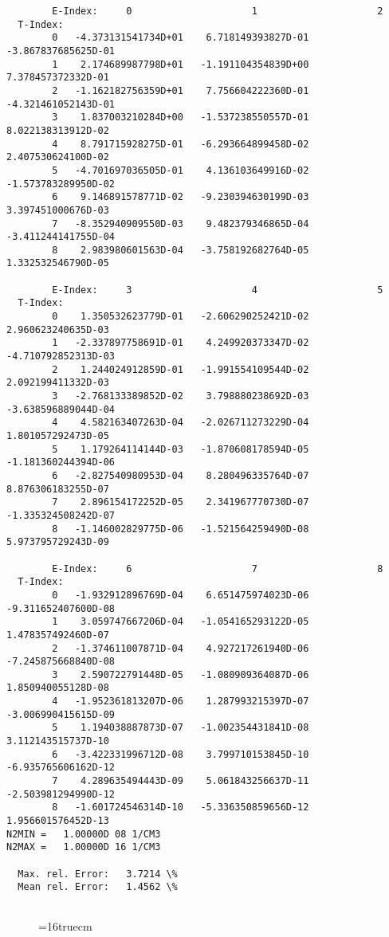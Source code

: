 \documentclass[12pt,dvipdfmx]{article}
\begin{document}
\begin{small}\begin{verbatim}
        E-Index:     0                     1                     2
  T-Index:
        0   -4.373131541734D+01    6.718149393827D-01   -3.867837685625D-01
        1    2.174689987798D+01   -1.191104354839D+00    7.378457372332D-01
        2   -1.162182756359D+01    7.756604222360D-01   -4.321461052143D-01
        3    1.837003210284D+00   -1.537238550557D-01    8.022138313912D-02
        4    8.791715928275D-01   -6.293664899458D-02    2.407530624100D-02
        5   -4.701697036505D-01    4.136103649916D-02   -1.573783289950D-02
        6    9.146891578771D-02   -9.230394630199D-03    3.397451000676D-03
        7   -8.352940909550D-03    9.482379346865D-04   -3.411244141755D-04
        8    2.983980601563D-04   -3.758192682764D-05    1.332532546790D-05

        E-Index:     3                     4                     5
  T-Index:
        0    1.350532623779D-01   -2.606290252421D-02    2.960623240635D-03
        1   -2.337897758691D-01    4.249920373347D-02   -4.710792852313D-03
        2    1.244024912859D-01   -1.991554109544D-02    2.092199411332D-03
        3   -2.768133389852D-02    3.798880238692D-03   -3.638596889044D-04
        4    4.582163407263D-04   -2.026711273229D-04    1.801057292473D-05
        5    1.179264114144D-03   -1.870608178594D-05   -1.181360244394D-06
        6   -2.827540980953D-04    8.280496335764D-07    8.876306183255D-07
        7    2.896154172252D-05    2.341967770730D-07   -1.335324508242D-07
        8   -1.146002829775D-06   -1.521564259490D-08    5.973795729243D-09

        E-Index:     6                     7                     8
  T-Index:
        0   -1.932912896769D-04    6.651475974023D-06   -9.311652407600D-08
        1    3.059747667206D-04   -1.054165293122D-05    1.478357492460D-07
        2   -1.374611007871D-04    4.927217261940D-06   -7.245875668840D-08
        3    2.590722791448D-05   -1.080909364087D-06    1.850940055128D-08
        4   -1.952361813207D-06    1.287993215397D-07   -3.006990415615D-09
        5    1.194038887873D-07   -1.002354431841D-08    3.112143515737D-10
        6   -3.422331996712D-08    3.799710153845D-10   -6.935765606162D-12
        7    4.289635494443D-09    5.061843256637D-11   -2.503981294990D-12
        8   -1.601724546314D-10   -5.336350859656D-12    1.956601576452D-13
N2MIN =   1.00000D 08 1/CM3
N2MAX =   1.00000D 16 1/CM3

  Max. rel. Error:   3.7214 \%
  Mean rel. Error:   1.4562 \%


\end{verbatim}\end{small}
\begin{figure} \label{2.2.5mai}
\epsfxsize=16truecm
\end{figure}
\newpage
\end{document}
